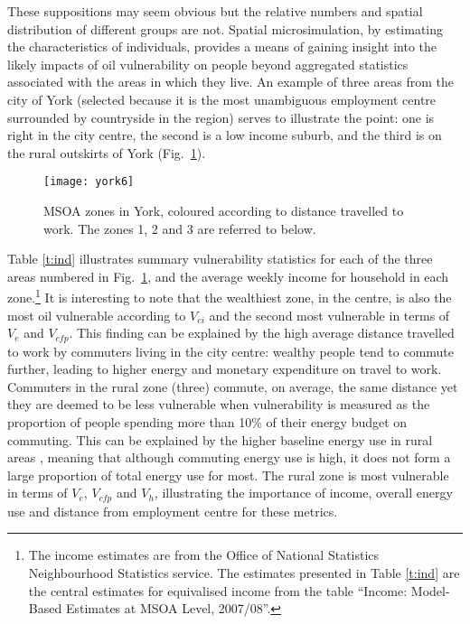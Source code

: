 These suppositions may seem obvious but the relative numbers and spatial
distribution of different groups are not. Spatial microsimulation, by estimating
the characteristics of individuals, provides a means of gaining insight into
the likely impacts of oil vulnerability on people beyond aggregated statistics
associated with the areas in which they live. An example of three areas from the
city of York (selected because it is the most unambiguous employment centre
surrounded by countryside in the region) serves to illustrate the point: one is
right in the city centre,
the second is a low income suburb, and the third is on the rural outskirts of
York
(Fig.~\ref{york}).

\begin{figure}[h]
 \centering
   \texttt{[image: york6]}
 \caption[MSOA zones in York, coloured according to distance travelled to
work]{MSOA zones in York, coloured according to distance travelled to work.
The zones 1, 2 and 3 are referred to below.}
 \label{york}
\end{figure}

Table \ref{t:ind} illustrates summary vulnerability statistics for each of
the three areas numbered in Fig.~\ref{york}, and the average weekly income
for household in each zone.\footnote{The
income estimates are from the Office of National Statistics
Neighbourhood Statistics service. The estimates presented in
Table \ref{t:ind} are the central estimates for equivalised
income from the table ``Income: Model-Based Estimates at MSOA Level, 2007/08''.}
It is interesting to note that the wealthiest zone, in the centre,
is also the most oil vulnerable according to $V_{ei}$ and the second most
vulnerable in terms of $V_e$ and $V_{cfp}$. This finding can be explained
by the high average distance travelled to work by commuters living in the
city centre: wealthy people tend to commute further, leading to higher
energy and monetary expenditure on travel to work. Commuters in the rural
zone (three) commute, on average, the same distance yet they are deemed to
be less vulnerable when vulnerability is measured as the proportion of
people spending more than 10\% of their energy budget
on commuting. This can be explained by the
higher baseline energy use in rural areas \citep{Druckman2008},
meaning that although commuting energy use is high, it does not
form a large proportion of total energy use for most.
The rural zone is most vulnerable in terms of $V_e$, $V_{cfp}$ and $V_h$,
illustrating the importance of income, overall energy use and distance
from employment centre for these metrics.

